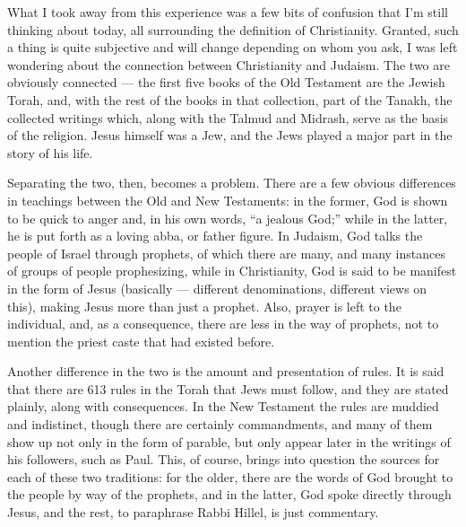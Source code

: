 \documentclass{book}
\begin{document}
What I took away from this experience was a few bits of confusion that I'm still thinking about today, all surrounding the definition of Christianity.  Granted, such a thing is quite subjective and will change depending on whom you ask, I was left wondering about the connection between Christianity and Judaism.  The two are obviously connected --- the first five books of the Old Testament are the Jewish Torah, and, with the rest of the books in that collection, part of the Tanakh, the collected writings which, along with the Talmud and Midrash, serve as the basis of the religion.  Jesus himself was a Jew, and the Jews played a major part in the story of his life.

Separating the two, then, becomes a problem.  There are a few obvious differences in teachings between the Old and New Testaments: in the former, God is shown to be quick to anger and, in his own words, ``a jealous God;'' while in the latter, he is put forth as a loving abba, or father figure.  In Judaism, God talks the people of Israel through prophets, of which there are many, and many instances of groups of people prophesizing, while in Christianity, God is said to be manifest in the form of Jesus (basically --- different denominations, different views on this), making Jesus more than just a prophet.  Also, prayer is left to the individual, and, as a consequence, there are less in the way of prophets, not to mention the priest caste that had existed before.

Another difference in the two is the amount and presentation of rules.  It is said that there are 613 rules in the Torah that Jews must follow, and they are stated plainly, along with consequences.  In the New Testament the rules are muddied and indistinct, though there are certainly commandments, and many of them show up not only in the form of parable, but only appear later in the writings of his followers, such as Paul.  This, of course, brings into question the sources for each of these two traditions: for the older, there are the words of God brought to the people by way of the prophets, and in the latter, God spoke directly through Jesus, and the rest, to paraphrase Rabbi Hillel, is just commentary.
\end{document}
